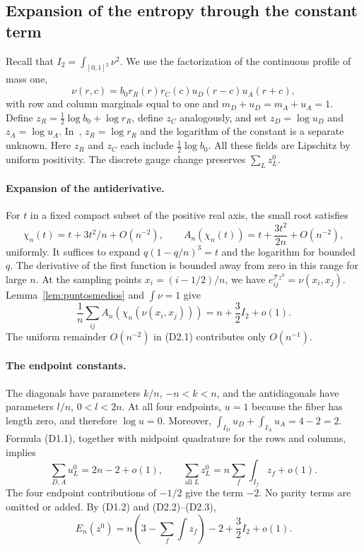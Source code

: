 \subsection{Expansion of the entropy through the constant term}\label{sec:D02}
Recall that $I_2=\int_{[0,1]^2}\nu^2$.
We use the factorization of the continuous profile of mass one,
\[
 \nu(r,c)=b_0 r_R(r)r_C(c)u_D(r-c)u_A(r+c),
\]
with row and column marginals equal to one and $m_D+u_D=m_A+u_A=1$.
Define $z_R=\tfrac12\log b_0+\log r_R$, define $z_C$ analogously, and set
$z_D=\log u_D$ and $z_A=\log u_A$.
In~\cite[Section~5]{Perfil}, $z_R=\log r_R$ and the logarithm of the constant is a separate unknown.
Here $z_R$ and $z_C$ each include $\tfrac12\log b_0$.
All these fields are Lipschitz by uniform positivity.
The discrete gauge change preserves $\sum_Lz_L^0$.

\paragraph{Expansion of the antiderivative.}
For $t$ in a fixed compact subset of the positive real axis, the small root satisfies
\[
 \chi_n(t)=t+3t^2/n+O(n^{-2}),\qquad
 A_n(\chi_n(t))=t+\frac{3t^2}{2n}+O(n^{-2}),          \tag{D2.1}
\]
uniformly. It suffices to expand $q(1-q/n)^3=t$ and the logarithm
for bounded $q$. The derivative of the first function is bounded away
from zero in this range for large $n$.
At the sampling points $x_i=(i-1/2)/n$, we have $e^{\mathcal Tz^0}_{ij}=\nu(x_i,x_j)$.
Lemma~\ref{lem:puntosmedios} and $\int\nu=1$ give
\[
 \frac1n\sum_{ij}A_n(\chi_n(\nu(x_i,x_j)))
      =n+\frac32 I_2+o(1).                         \tag{D2.2}
\]
The uniform remainder $O(n^{-2})$ in (D2.1) contributes only $O(n^{-1})$.

\paragraph{The endpoint constants.}
The diagonals have parameters $k/n$, $-n<k<n$, and the antidiagonals have parameters $l/n$,
$0<l<2n$. At all four endpoints, $u=1$ because the fiber has
length zero, and therefore $\log u=0$.
Moreover, $\int_{I_D}u_D+\int_{I_A}u_A=4-2=2$.
Formula (D1.1), together with midpoint quadrature for the rows and columns, implies
\[
 \sum_{D,A}u_L^0=2n-2+o(1),\qquad
 \sum_{\text{all }L}z_L^0=n\sum_f\int_{I_f}z_f+o(1).   \tag{D2.3}
\]
The four endpoint contributions of $-1/2$ give the term $-2$.
No parity terms are omitted or added.
By (D1.2) and (D2.2)--(D2.3),
\[
 E_n(z^0)=n\left(3-\sum_f\int z_f\right)-2
                                    +\frac32I_2+o(1).    \tag{D2.4}
\]

